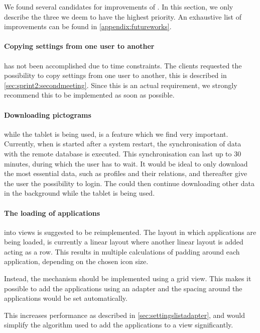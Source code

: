 We found several candidates for improvements of \launcher.
In this section, we only describe the three we deem to have the highest priority.
An exhaustive list of improvements can be found in \cref{appendix:futureworks}.

\paragraph{Copying settings from one user to another} has not been accomplished due to time constraints.
The clients requested the possibility to copy settings from one user to another, this is described in \cref{sec:sprint2:secondmeeting}.
Since this is an actual requirement, we strongly recommend this to be implemented as soon as possible.

\paragraph{Downloading pictograms} while the tablet is being used, is a feature which we find very important.
Currently, when \launcher is started after a system restart, the synchronisation of data with the remote database is executed.
This synchronisation can last up to 30 minutes, during which the user has to wait.
It would be ideal to only download the most essential data, such as profiles and their relations, and thereafter give the user the possibility to login.
The \launcher could then continue downloading other data in the background while the tablet is being used.

\paragraph{The loading of applications} into views is suggested to be reimplemented. 
The layout in which applications are being loaded, is currently a linear layout where another linear layout is added acting as a row.
This results in multiple calculations of padding around each application, depending on the chosen icon size.

Instead, the mechanism should be implemented using a grid view.
This makes it possible to add the applications using an adapter and the spacing around the applications would be set automatically.

This increases performance as described in \cref{sec:settingslistadapter}, and would simplify the algorithm used to add the applications to a view significantly.